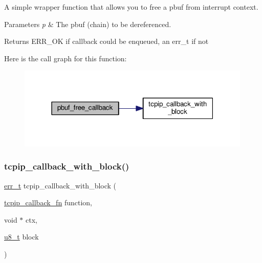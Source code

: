 A simple wrapper function that allows you to free a pbuf from interrupt context.


\begin{DoxyParams}{Parameters}
{\em p} & The pbuf (chain) to be dereferenced. \\
\hline
\end{DoxyParams}
\begin{DoxyReturn}{Returns}
E\+R\+R\+\_\+\+OK if callback could be enqueued, an err\+\_\+t if not 
\end{DoxyReturn}
Here is the call graph for this function\+:
\nopagebreak
\begin{figure}[H]
\begin{center}
\leavevmode
\includegraphics[width=316pt]{openmote-cc2538_2lwip_2src_2include_2lwip_2tcpip_8h_a5cdcb6b784fe0e8736a5b31a5cfbed6c_cgraph}
\end{center}
\end{figure}
\mbox{\label{openmote-cc2538_2lwip_2src_2include_2lwip_2tcpip_8h_ab1d3ef23817d7703fa75ed67bd45ea1d}} 
\subsubsection{\texorpdfstring{tcpip\+\_\+callback\+\_\+with\+\_\+block()}{tcpip\_callback\_with\_block()}}
{\footnotesize\ttfamily \hyperlink{group__infrastructure__errors_gaf02d9da80fd66b4f986d2c53d7231ddb}{err\+\_\+t} tcpip\+\_\+callback\+\_\+with\+\_\+block (\begin{DoxyParamCaption}\item[{\hyperlink{openmote-cc2538_2lwip_2src_2include_2lwip_2tcpip_8h_a35203296bb838f3b493839ffc6e7285d}{tcpip\+\_\+callback\+\_\+fn}}]{function,  }\item[{void $\ast$}]{ctx,  }\item[{\hyperlink{group__compiler__abstraction_ga4caecabca98b43919dd11be1c0d4cd8e}{u8\+\_\+t}}]{block }\end{DoxyParamCaption})}

